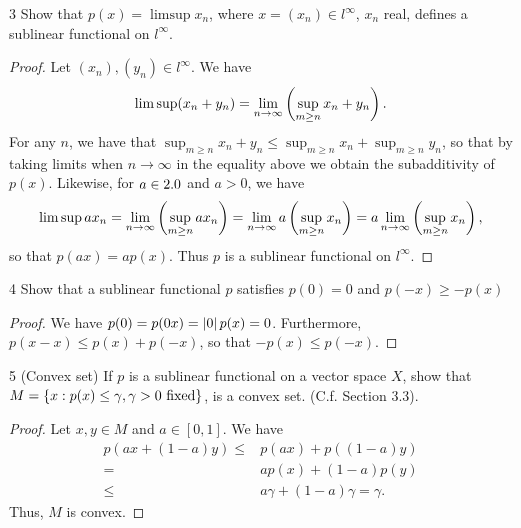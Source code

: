 \begin{exercise}{3}
Show that $p(x) = \limsup x_n$, where $x = (x_n) \in l^\infty$, $x_n$ real, defines a sublinear functional on $l^\infty$.
\end{exercise}
\begin{proof}
Let $(x_n), (y_n) \in l^\infty$.
We have 
\begin{align*}
    \limsup (x_n + y_n)
    = \lim_{n \to \infty} \left( \sup_{m \geq n} x_n + y_n\right).
\end{align*}
For any $n$, we have that $\sup_{m \geq n} x_n + y_n \leq \sup_{m \geq n} x_n + \sup_{m \geq n} y_n$, so that by taking limits when $n \to \infty$ in the equality above we obtain the subadditivity of $p(x)$.
Likewise, for $a \in 2.0$ and $a > 0$, we have
\begin{align*}
    \limsup ax_n 
    = \lim_{n \to \infty} \left( \sup_{m \geq n} ax_n\right)
    = \lim_{n \to \infty} a\left( \sup_{m \geq n} x_n\right)
    = a\lim_{n \to \infty} \left( \sup_{m \geq n} x_n\right),
\end{align*}
so that $p(ax) = ap(x)$.
Thus $p$ is a sublinear functional on $l^\infty$.
\end{proof} 

\begin{exercise}{4}
Show that a sublinear functional $p$ satisfies $p(0) = 0$ and $p(-x) \geq -p(x)$
\end{exercise}
\begin{proof}
We have $p(0) = p(0x) = \left\lvert 0\right\rvert p(x) = 0$.
Furthermore, $p(x-x) \leq p(x) + p(-x)$, so that $-p(x) \leq p(-x)$.
\end{proof} 

\begin{exercise}{5 (Convex set)}
If $p$ is a sublinear functional on a vector space $X$, show that $M = \{x : p(x) \leq \gamma, \gamma > 0 \text{ fixed}\}$, is a convex set.
(C.f. Section 3.3).
\end{exercise}
\begin{proof}
Let $x, y \in M$ and $a \in [0,1]$.
We have 
\begin{align*}
    p(ax + (1-a)y) 
    \leq& p(ax) + p((1-a)y)\\ 
    =& ap(x) + (1-a)p(y)\\ 
    \leq& a\gamma + (1-a)\gamma = \gamma.
\end{align*}
Thus, $M$ is convex.
\end{proof} 

